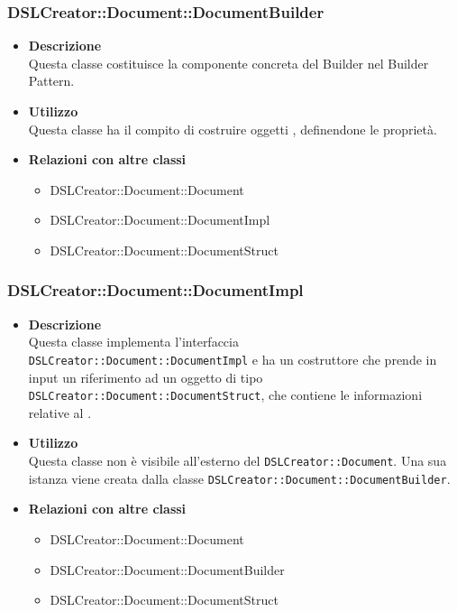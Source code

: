 \subsubsection{DSLCreator::Document::DocumentBuilder}
                    \begin{itemize}
                        \item \textbf{Descrizione} \hfill \\
                            Questa classe costituisce la componente concreta del Builder nel Builder Pattern.
                        \item \textbf{Utilizzo} \hfill \\
                            Questa classe ha il compito di costruire oggetti , definendone le proprietà.
                        \item \textbf{Relazioni con altre classi}
                            \begin{itemize}
                              \item DSLCreator::Document::Document
                              \item DSLCreator::Document::DocumentImpl
                              \item DSLCreator::Document::DocumentStruct
                            \end{itemize}
                    \end{itemize}

 \subsubsection{DSLCreator::Document::DocumentImpl}
                    \begin{itemize}
                        \item \textbf{Descrizione} \hfill \\
                            Questa classe implementa l'interfaccia \texttt{DSLCreator::Document::DocumentImpl} e ha un costruttore che prende in input un riferimento ad un oggetto di tipo \texttt{DSLCrea\-tor::Document::DocumentStruct}, che contiene le informazioni relative al .
                        \item \textbf{Utilizzo} \hfill \\
                            Questa classe non è visibile all'esterno del  \texttt{DSLCreator::Document}. Una sua istanza viene creata dalla classe \texttt{DSLCreator::Document::DocumentBuilder}.
                        \item \textbf{Relazioni con altre classi}
                            \begin{itemize}
                              \item DSLCreator::Document::Document
                              \item DSLCreator::Document::DocumentBuilder
                              \item DSLCreator::Document::DocumentStruct
                            \end{itemize}
                    \end{itemize}

